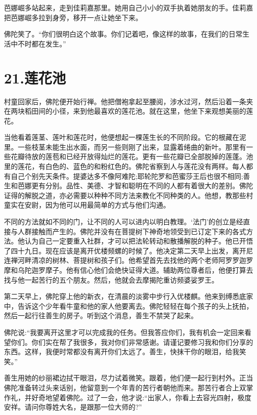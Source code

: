 \documentclass[12pt,twoside,openany]{book}
\begin{document}
芭娜崛多站起来，走到佳莉嘉那里。她用自己小小的双手执着她朋友的手。佳莉嘉把芭娜崛多拉到身旁，移开一点让她坐下来。

佛陀笑了。“你们很明白这个故事。你们记着吧，像这样的故事，在我们的日常生活中不时都在发生。”


\chapter{21.莲花池}\label{ch21}

村童回家后，佛陀便开始行禅。他把僧袍拿起至腰阅，涉水过河，然后沿着一条夹在两块稻田间的小径，来到他最喜欢的莲花池。就在这里，他坐下来观想美丽的莲花。

当他看着莲茎、莲叶和莲花时，他便想起一棵莲生长的不同阶段。它的根藏在泥里。一些枝茎未能生出水面，而另一些则刚了出来，显露着绻曲的新叶。那里有一些花瓣待放的莲苞和已经开放得灿烂的莲花。更有一些花瓣已全部脱掉的莲蓬。池里的莲花，有白色的、蓝色的和粉红色的。佛陀省察到人与莲花没有两样。每人都有自己个别先天条件。提婆达多不像阿难陀;耶轮陀罗和芭蜜莎王后也很不相同;善生和芭娜更有分别。品性、美德、才智和聪明在不同的人都有着很大的差别。佛陀证得的解脱之道，亦必需要以种种不同方法来教化不同种类的人。他想，教那些村童实在安尉，因为他可以用最简单的方式与他们沟通。

不同的方法就如不同的门，让不同的人可以进内以明白教理。‘法门’的创立是经直接与人群接触而产生的。佛陀并没有在菩提树下神奇地领受到已订定下来的各式方法。他认为自己一定要重入社群，才可以把法轮转动和散播解脱的种子。他已开悟了四十九日。现在应该是离开优楼频螺的时候了。他决定第二天早上出发，离开尼连禅河畔清凉的树林、菩提树和孩子们。他希望首先去找他的两个老师阿罗罗迦罗摩和乌陀迦罗摩子。他有信心他们会绝快证得大道。辅助两位尊者后，他便打算去找与他一起苦行的五个朋友。然后，他就会去摩揭陀重访频婆娑罗王。

第二天早上，佛陀穿上他的新衣，在清晨的淡雾中步行入优楼麒。他来到缚悉底家中，告诉这个少年看牛童和他的家人他要离去。佛陀轻轻在每个孩子的头上抚拍，然后一起行往善生的房子。听到这个消息，善生不禁哭了起来。

佛陀说:“我要离开这里才可以完成我的任务。但我答应你们，我有机会一定回来看望你们。你们实在帮了我很多，我对你们非常感谢。请谨记要修习我和你们分享的东西。这样，我便时常都没有离开你们太远了。善生，快抹干你的眼泪，给我笑笑。”

善生用她的纱丽裙边拭干眼泪，尽力试着微笑。跟着，他们便一起行到村外。正当佛陀准备转过头来话别，他留意到一个年青的苦行者朝他而来。那苦行者合上双掌作礼，并好奇地望着佛陀。过了一会，他才说:“出家人，你看上去容光四射，极度安祥。请问你尊姓大名，是跟那一位大师的?”
\end{document}
